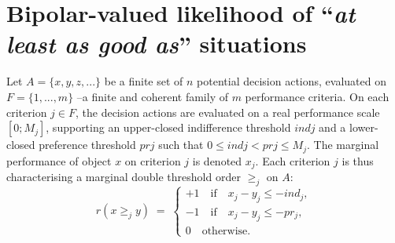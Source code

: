 \section{Bipolar-valued likelihood of ``\emph{at least as good as}'' situations}
\label{sec:18.2}

Let $A = \{x, y, z,...\}$ be a finite set of $n$ potential decision actions, evaluated on $F = \{1,..., m\}$ --a finite and coherent family of $m$ performance criteria. On each criterion $j \in F$, the decision actions are evaluated on a real performance scale $[0; M_j ]$, supporting an upper-closed indifference threshold $indj$ and a lower-closed preference threshold $prj$ such that $0 \leq indj < prj \leq M_j$. The marginal performance of object $x$ on criterion $j$ is denoted $x_j$. Each criterion $j$ is thus characterising a marginal double threshold order $\geq_j$ on $A$:
\begin{equation}
  r(x \geq_j y) \; = \; \begin{cases} +1 \quad \text{if} \quad x_j - y_j \leq -ind_j,\\  -1 \quad \text{if} \quad x_j - y_j \leq -pr_j,\\ 0 \quad \text{otherwise}. \end{cases}
\end{equation}

